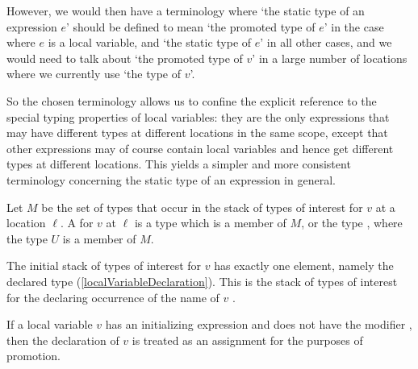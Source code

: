 \documentclass[makeidx]{article}
\begin{document}
{{  However, we would then have a terminology where
  `the static type of an expression $e$'
  should be defined to mean `the promoted type of $e$'
  in the case where $e$ is a local variable,
  and `the static type of $e$' in all other cases,
  and we would need to talk about `the promoted type of $v$'
  in a large number of locations where we currently
  use `the type of $v$'.

  So the chosen terminology allows us to confine the explicit reference to
  the special typing properties of local variables:
  they are the only expressions that may have different
  types at different locations in the same scope,
  except that other expressions may of course contain local variables
  and hence get different types at different locations.
  This yields a simpler and more consistent terminology
  concerning the static type of an expression in general.%
}

\LMHash{}%
Let $M$ be the set of types that occur in
the stack of types of interest for $v$ at a location $\ell$.
A  for $v$ at $\ell$
is a type which is a member of $M$,
or the type ,
where the type $U$ is a member of $M$.



\LMHash{}%
The initial stack of types of interest for $v$ has exactly one element,
namely the declared type
(\ref{localVariableDeclaration}).
This is the stack of types of interest
for the declaring occurrence of the name of $v$
.

\LMHash{}%
If a local variable $v$ has an initializing expression
and does not have the modifier \FINAL,
%
then the declaration of $v$ is treated as an assignment
for the purposes of promotion.

}
\end{document}
